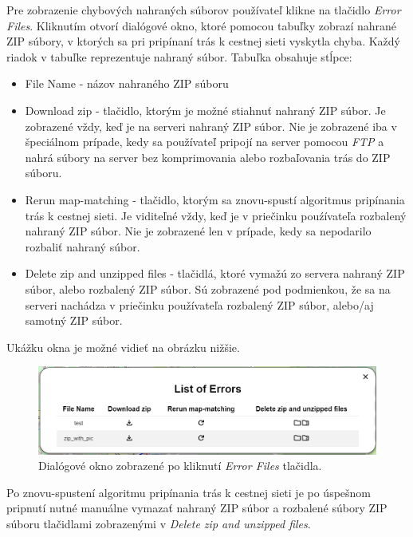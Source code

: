 Pre zobrazenie chybových nahraných súborov používateľ klikne na tlačidlo \textit{Error Files}. Kliknutím otvorí dialógové okno, ktoré pomocou tabuľky zobrazí nahrané ZIP súbory, v ktorých sa pri pripínaní trás k cestnej sieti vyskytla chyba. Každý riadok v tabuľke reprezentuje nahraný súbor. Tabuľka obsahuje stĺpce:
\begin{itemize}
  \item File Name - názov nahraného ZIP súboru
  \item Download zip - tlačidlo, ktorým je možné stiahnuť nahraný ZIP súbor. Je zobrazené vždy, keď je na serveri nahraný ZIP súbor. Nie je zobrazené iba v špeciálnom prípade, kedy sa používateľ pripojí na server pomocou \textit{FTP} a nahrá súbory na server bez komprimovania alebo rozbaľovania trás do ZIP súboru.
  \item Rerun map-matching - tlačidlo, ktorým sa znovu-spustí algoritmus pripínania trás k cestnej sieti. Je viditeľné vždy, keď je v priečinku pouźívateľa rozbalený nahraný ZIP súbor. Nie je zobrazené len v prípade, kedy sa nepodarilo rozbaliť nahraný súbor.
  \item Delete zip and unzipped files - tlačidlá, ktoré vymažú zo servera nahraný ZIP súbor, alebo rozbalený ZIP súbor. Sú zobrazené pod podmienkou, že sa na serveri nachádza v priečinku používateľa rozbalený ZIP súbor, alebo/aj samotný ZIP súbor.
\end{itemize}
Ukážku okna je možné vidieť na obrázku nižšie.
\begin{figure}[H]
  \centering
  \includegraphics[width=1 \textwidth]{img/tools-panel/errors-dialog.png}
  \caption{Dialógové okno zobrazené po kliknutí \textit{Error Files} tlačidla.}
\end{figure}
\noindent Po znovu-spustení algoritmu pripínania trás k cestnej sieti je po úspešnom pripnutí nutné manuálne vymazať nahraný ZIP súbor a rozbalené súbory ZIP súboru tlačidlami zobrazenými v \textit{Delete zip and unzipped files}.
